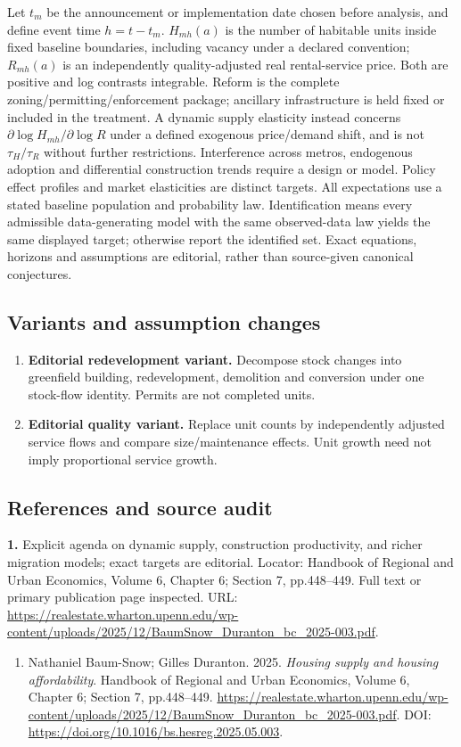 \documentclass[11pt,a4paper]{article}
\begin{document}
Let \(t_m\) be the announcement or implementation date chosen before analysis, and define event time \(h=t-t_m\). \(H_{mh}(a)\) is the number of habitable units inside fixed baseline boundaries, including vacancy under a declared convention; \(R_{mh}(a)\) is an independently quality-adjusted real rental-service price. Both are positive and log contrasts integrable. Reform is the complete zoning/permitting/enforcement package; ancillary infrastructure is held fixed or included in the treatment. A dynamic supply elasticity instead concerns \(\partial\log H_{mh}/\partial\log R\) under a defined exogenous price/demand shift, and is not \(\tau_H/\tau_R\) without further restrictions. Interference across metros, endogenous adoption and differential construction trends require a design or model. Policy effect profiles and market elasticities are distinct targets. All expectations use a stated baseline population and probability law. Identification means every admissible data-generating model with the same observed-data law yields the same displayed target; otherwise report the identified set. Exact equations, horizons and assumptions are editorial, rather than source-given canonical conjectures.
\subsection*{Variants and assumption changes}
\begin{enumerate}
\item \textbf{Editorial redevelopment variant.} Decompose stock changes into greenfield building, redevelopment, demolition and conversion under one stock-flow identity. Permits are not completed units.
\item \textbf{Editorial quality variant.} Replace unit counts by independently adjusted service flows and compare size/maintenance effects. Unit growth need not imply proportional service growth.
\end{enumerate}
\subsection*{References and source audit}
\textbf{1.} Explicit agenda on dynamic supply, construction productivity, and richer migration models; exact targets are editorial. Locator: Handbook of Regional and Urban Economics, Volume 6, Chapter 6; Section 7, pp.448–449. Full text or primary publication page inspected. URL: \url{https://realestate.wharton.upenn.edu/wp-content/uploads/2025/12/BaumSnow_Duranton_bc_2025-003.pdf}.
\begin{enumerate}\raggedright
\item\hypertarget{definitions:source:30007742:1}{} Nathaniel Baum-Snow; Gilles Duranton. 2025. \emph{Housing supply and housing affordability}. Handbook of Regional and Urban Economics, Volume 6, Chapter 6; Section 7, pp.448–449.
\url{https://realestate.wharton.upenn.edu/wp-content/uploads/2025/12/BaumSnow_Duranton_bc_2025-003.pdf}.
DOI: \url{https://doi.org/10.1016/bs.hesreg.2025.05.003}.
\end{enumerate}
\end{document}
